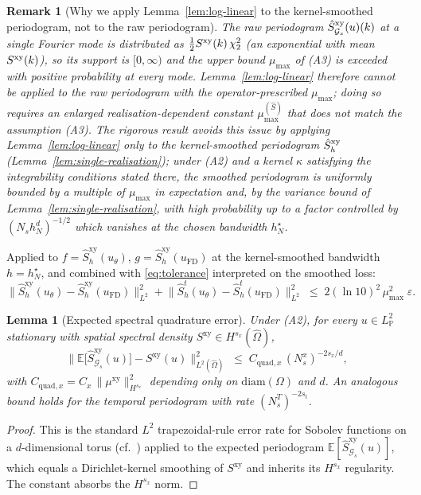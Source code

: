 \documentclass[review,12pt]{elsarticle}
\newtheorem{remark}{Remark}
\newtheorem{lemma}{Lemma}
\begin{document}
\begin{remark}[Why we apply Lemma~\ref{lem:log-linear} to the
kernel-smoothed periodogram, not to the raw periodogram]
\label{rem:why-smoothed}
The raw periodogram $\hat S^{\rm xy}_{\mathcal G_s}(u)(k)$ at a
single Fourier mode is distributed as $\tfrac12 S^{\rm xy}(k)\,\chi^2_2$
(an exponential with mean $S^{\rm xy}(k)$), so its support is
$[0,\infty)$ and the upper bound $\mu_{\max}$ of (A3) is exceeded
with positive probability at every mode. Lemma~\ref{lem:log-linear}
therefore cannot be applied to the raw periodogram with the
operator-prescribed $\mu_{\max}$; doing so requires an enlarged
realisation-dependent constant $\mu_{\max}^{(\hat S)}$ that does not
match the assumption (A3). The rigorous result avoids this issue
by applying Lemma~\ref{lem:log-linear} only to the
\emph{kernel-smoothed} periodogram $\hat S^{\rm xy}_h$
(Lemma~\ref{lem:single-realisation}); under (A2) and a kernel
$\kappa$ satisfying the integrability conditions stated there, the
smoothed periodogram is uniformly bounded by a multiple of
$\mu_{\max}$ in expectation and, by the variance bound of
Lemma~\ref{lem:single-realisation}, with high probability up to a
factor controlled by $(N_s h_N^d)^{-1/2}$ which vanishes at the
chosen bandwidth $h_N^\star$.
\end{remark}

Applied to \(f = \widehat S^{\mathrm{xy}}_{h}(u_\theta)\),
\(g = \widehat S^{\mathrm{xy}}_{h}(u_{\mathrm{FD}})\) at the
kernel-smoothed bandwidth $h = h_N^\star$, and combined with
\eqref{eq:tolerance} interpreted on the smoothed loss:
\begin{equation}
\bigl\|\widehat S^{\mathrm{xy}}_h(u_\theta)
- \widehat S^{\mathrm{xy}}_h(u_{\mathrm{FD}})
\bigr\|^2_{L^2}
+ \bigl\|\widehat S^t_h(u_\theta)
- \widehat S^t_h(u_{\mathrm{FD}})
\bigr\|^2_{L^2}
\;\le\; 2(\ln 10)^2\,\mu_{\max}^2\;\varepsilon.
\label{eq:log-linear-applied}
\end{equation}

\begin{lemma}[Expected spectral quadrature error]
\label{lem:quadrature}
Under (A2), for every \(u \in L^2_{\mathbb P}\) stationary with
spatial spectral density
\(S^{\mathrm{xy}} \in H^{s_x}(\widehat\Omega)\),
\[
\bigl\|\mathbb E\bigl[\widehat S^{\mathrm{xy}}_{\mathcal G_s}(u)\bigr]
- S^{\mathrm{xy}}(u)\bigr\|^2_{L^2(\widehat\Omega)}
\;\le\; C_{\mathrm{quad},x}\,(N_s^x)^{-2s_x/d},
\]
with \(C_{\mathrm{quad},x} = C_x\,\|\mu^{\mathrm{xy}}\|^2_{H^{s_x}}\)
depending only on \(\mathrm{diam}(\Omega)\) and \(d\). An analogous
bound holds for the temporal periodogram with rate \((N_s^T)^{-2s_t}\).
\end{lemma}
\begin{proof}
This is the standard \(L^2\) trapezoidal-rule error rate for
Sobolev functions on a \(d\)-dimensional torus
(cf.~\cite[Sec.~6.5]{Trefethen2000}) applied to the expected
periodogram \(\mathbb E[\widehat S^{\mathrm{xy}}_{\mathcal G_s}(u)]\),
which equals a Dirichlet-kernel smoothing of \(S^{\mathrm{xy}}\) and
inherits its \(H^{s_x}\) regularity. The constant absorbs the
\(H^{s_x}\) norm.
\end{proof}
\end{document}
